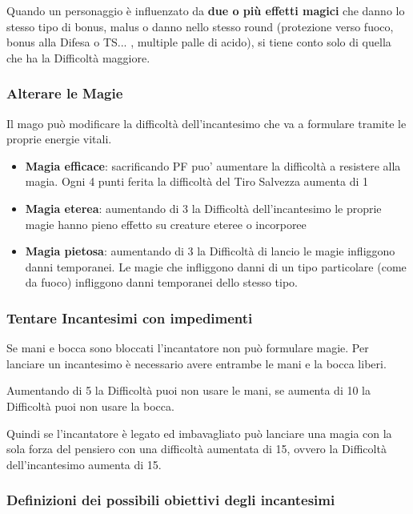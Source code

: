 Quando un personaggio è influenzato da \textbf{due o più effetti magici} che danno lo stesso tipo di bonus, malus o danno nello stesso round (protezione verso fuoco, bonus alla Difesa o TS... , multiple palle di acido), si tiene conto solo di quella che ha la Difficoltà maggiore.

\subsubsection{Alterare le Magie}

Il mago può modificare la difficoltà dell'incantesimo che va a formulare tramite le proprie energie vitali.

\begin{itemize}
	\item
	\textbf{Magia efficace}: sacrificando PF puo’ aumentare la difficoltà a resistere alla magia. Ogni 4 punti ferita la difficoltà del Tiro Salvezza aumenta di 1
	\item
	\textbf{Magia eterea}: aumentando di 3 la Difficoltà dell'incantesimo le proprie magie hanno pieno effetto su creature eteree o incorporee
	\item
	\textbf{Magia pietosa}: aumentando di 3 la Difficoltà di lancio le magie infliggono danni temporanei. 
	Le magie che infliggono danni di un tipo particolare (come da fuoco) infliggono danni temporanei dello stesso tipo.
\end{itemize}

\subsubsection{Tentare Incantesimi con impedimenti} 

Se mani e bocca sono bloccati l'incantatore non può formulare magie. Per lanciare un incantesimo è necessario avere entrambe le mani e la bocca liberi.

Aumentando di 5 la Difficoltà puoi non usare le mani, se aumenta di 10 la Difficoltà puoi non usare la bocca.

Quindi se l'incantatore è legato ed imbavagliato può lanciare una magia con la sola forza del pensiero con una difficoltà aumentata di 15, ovvero la Difficoltà dell'incantesimo aumenta di 15.

\subsubsection{Definizioni dei possibili obiettivi degli incantesimi}

